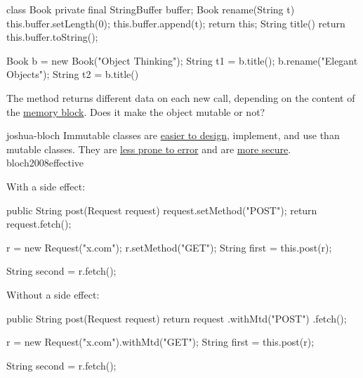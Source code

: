 \documentclass{article}
\begin{document}
\begin{pptWide}{2}
{\small\begin{ffcode}
class Book {
  private final StringBuffer buffer;
  Book rename(String t) {
    this.buffer.setLength(0);
    this.buffer.append(t);
    return this;
  }
  String title() {
    return this.buffer.toString();
  }
}
\end{ffcode}
}
\par\columnbreak\par
{\small\begin{ffcode}
Book b = new Book("Object Thinking");
String t1 = b.title();
b.rename("Elegant Objects");
String t2 = b.title()
\end{ffcode}
}
\par
The  method returns different data on each new call,
depending on the content of the \ul{memory block}.
Does it make the object mutable or not?
\end{pptWide}
\par
\plush{}



\qte
  {joshua-bloch}
  {Immutable classes are \ul{easier to design}, implement, and use than mutable classes. They are \ul{less prone to error} and are \ul{more secure}.}
  {bloch2008effective}

\begin{pptWide}{2}
With a side effect:\par
{\small\begin{ffcode}
public String post(Request request) {
  request.setMethod("POST");
  return request.fetch();
}

r = new Request("x.com");
r.setMethod("GET");
String first = this.post(r);

String second = r.fetch();
\end{ffcode}
}
\par\columnbreak\par
Without a side effect:\par
{\small\begin{ffcode}
public String post(Request request) {
  return request
    .withMtd("POST")
    .fetch();
}

r = new Request("x.com").withMtd("GET");
String first = this.post(r);

String second = r.fetch();
\end{ffcode}
}
\end{pptWide}
\par
\plush{}
\end{document}

